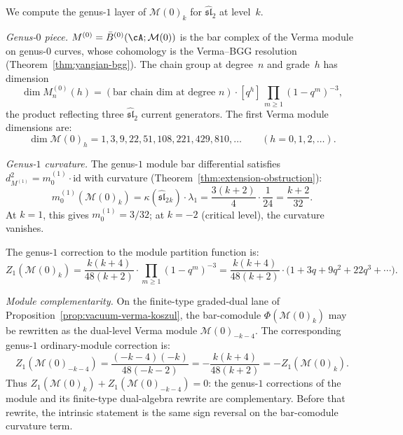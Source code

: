 \begin{example}
\label{ex:verma-genus-graded}
We compute the genus-$1$ layer of $\mathcal{M}(0)_k$ for $\widehat{\mathfrak{sl}}_2$ at level~$k$.

\emph{Genus-$0$ piece.}
$M^{(0)} = \bar{B}^{(0)}(\cA; \mathcal{M}(0))$
is the bar complex of the Verma module on genus-$0$ curves, whose
cohomology is the Verma--BGG resolution
(Theorem~\ref{thm:yangian-bgg}). The chain group
at degree~$n$ and grade~$h$ has dimension
\[
\dim M^{(0)}_n(h) = (\text{bar chain dim at degree } n)
\cdot [q^h]\,\prod_{m \geq 1}(1-q^m)^{-3},
\]
the product reflecting three $\widehat{\mathfrak{sl}}_2$
current generators. The first Verma module dimensions are:
\begin{equation}\label{eq:verma-dims-sl2}
\dim \mathcal{M}(0)_h = 1, 3, 9, 22, 51, 108, 221, 429, 810,
\ldots \qquad (h = 0, 1, 2, \ldots).
\end{equation}

\emph{Genus-$1$ curvature.}
The genus-$1$ module bar differential satisfies
$d_{M^{(1)}}^2 = m_0^{(1)} \cdot \mathrm{id}$
with curvature (Theorem~\ref{thm:extension-obstruction}):
\begin{equation}\label{eq:verma-genus1-curvature}
m_0^{(1)}(\mathcal{M}(0)_k)
= \kappa(\widehat{\mathfrak{sl}}_2{}_k) \cdot \lambda_1
= \frac{3(k+2)}{4} \cdot \frac{1}{24}
= \frac{k+2}{32}.
\end{equation}
At $k = 1$, this gives $m_0^{(1)} = 3/32$;
at $k = -2$ (critical level), the curvature vanishes.

The genus-$1$ correction to the module partition function is:
\begin{equation}\label{eq:verma-genus1-correction}
Z_1(\mathcal{M}(0)_k)
= \frac{k(k+4)}{48(k+2)}
\cdot \prod_{m \geq 1}(1-q^m)^{-3}
= \frac{k(k+4)}{48(k+2)}
\cdot \bigl(1 + 3q + 9q^2 + 22q^3 + \cdots\bigr).
\end{equation}

\emph{Module complementarity.}
On the finite-type graded-dual lane of
Proposition~\ref{prop:vacuum-verma-koszul}, the bar-comodule
$\Phi(\mathcal{M}(0)_k)$ may be rewritten as the dual-level Verma
module $\mathcal{M}(0)_{-k-4}$. The corresponding genus-$1$
ordinary-module correction is:
\[
Z_1(\mathcal{M}(0)_{-k-4})
= \frac{(-k-4)(-k)}{48(-k-2)}
= -\frac{k(k+4)}{48(k+2)}
= -Z_1(\mathcal{M}(0)_k).
\]
Thus $Z_1(\mathcal{M}(0)_k) + Z_1(\mathcal{M}(0)_{-k-4}) = 0$:
the genus-$1$ corrections of the module and its finite-type
dual-algebra rewrite are complementary. Before that rewrite, the
intrinsic statement is the same sign reversal on the bar-comodule
curvature term.


\end{example}

